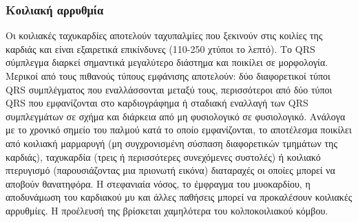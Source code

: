 \subsubsection{Κοιλιακή αρρυθμία} 
Οι κοιλιακές ταχυκαρδίες αποτελούν ταχυπαλμίες που ξεκινούν στις κοιλίες της καρδιάς και είναι εξαιρετικά επικίνδυνες (110-250 χτύποι το λεπτό). Το \en QRS \gr σύμπλεγμα διαρκεί σημαντικά μεγαλύτερο διάστημα και ποικίλει σε μορφολογία. Μερικοί από τους πιθανούς τύπους εμφάνισης αποτελούν: δύο διαφορετικοί τύποι \en QRS \gr συμπλέγματος που εναλλάσσονται μεταξύ τους, περισσότεροι από δύο τύποι \en QRS \gr που εμφανίζονται στο καρδιογράφημα ή σταδιακή εναλλαγή των \en QRS \gr συμπλεγμάτων σε σχήμα και διάρκεια από μη φυσιολογικό σε φυσιολογικό. Ανάλογα με το χρονικό σημείο του παλμού κατά το οποίο εμφανίζονται, το αποτέλεσμα ποικίλει από κοιλιακή μαρμαρυγή (μη συγχρονισμένη σύσπαση διαφορετικών τμημάτων της καρδιάς), ταχυκαρδία (τρεις ή περισσότερες συνεχόμενες συστολές) ή κοιλιακό πτερυγισμό (παρουσιάζοντας μια πριονωτή εικόνα) διαταραχές οι οποίες μπορεί να αποβούν θανατηφόρα. Η στεφανιαία νόσος, το έμφραγμα του μυοκαρδίου, η αποδυνάμωση του καρδιακού μυ και άλλες παθήσεις μπορεί να προκαλέσουν κοιλιακές αρρυθμίες. H προέλευσή της βρίσκεται χαμηλότερα του κολποκοιλιακού κόμβου.
